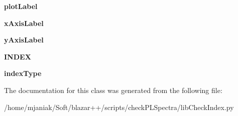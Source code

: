 \begin{DoxyCompactItemize}
\item 
\hypertarget{classlibCheckIndex_1_1checkIndex_a7fe48fb839bdcba7096e859a2293e9e2}{{\bfseries plot\-Label}}\label{classlibCheckIndex_1_1checkIndex_a7fe48fb839bdcba7096e859a2293e9e2}

\item 
\hypertarget{classlibCheckIndex_1_1checkIndex_a7c618477ffa1b20afe3143601f4d3cc2}{{\bfseries x\-Axis\-Label}}\label{classlibCheckIndex_1_1checkIndex_a7c618477ffa1b20afe3143601f4d3cc2}

\item 
\hypertarget{classlibCheckIndex_1_1checkIndex_a3ae4866d2a08d82986ee7f9f54c1c347}{{\bfseries y\-Axis\-Label}}\label{classlibCheckIndex_1_1checkIndex_a3ae4866d2a08d82986ee7f9f54c1c347}

\item 
\hypertarget{classlibCheckIndex_1_1checkIndex_a1a09157a7c0563d3a63a8726ba48769f}{{\bfseries I\-N\-D\-E\-X}}\label{classlibCheckIndex_1_1checkIndex_a1a09157a7c0563d3a63a8726ba48769f}

\item 
\hypertarget{classlibCheckIndex_1_1checkIndex_adced2c37de3fae731e58269e67532b29}{{\bfseries index\-Type}}\label{classlibCheckIndex_1_1checkIndex_adced2c37de3fae731e58269e67532b29}

\end{DoxyCompactItemize}


The documentation for this class was generated from the following file\-:\begin{DoxyCompactItemize}
\item 
/home/mjaniak/\-Soft/blazar++/scripts/check\-P\-L\-Spectra/lib\-Check\-Index.\-py\end{DoxyCompactItemize}
